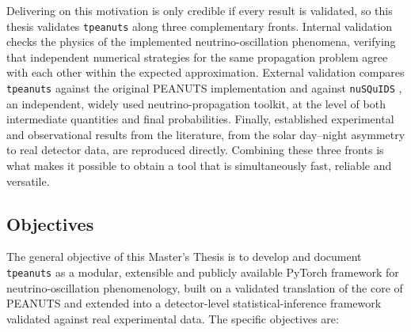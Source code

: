 Delivering on this motivation is only credible if every result is validated, so this thesis validates \texttt{tpeanuts} along three complementary fronts. Internal validation checks the physics of the implemented neutrino-oscillation phenomena, verifying that independent numerical strategies for the same propagation problem agree with each other within the expected approximation. External validation compares \texttt{tpeanuts} against the original PEANUTS implementation and against \texttt{nuSQuIDS} \parencite{nuSQuIDS}, an independent, widely used neutrino-propagation toolkit, at the level of both intermediate quantities and final probabilities. Finally, established experimental and observational results from the literature, from the solar day--night asymmetry to real detector data, are reproduced directly. Combining these three fronts is what makes it possible to obtain a tool that is simultaneously fast, reliable and versatile.

\subsection{Objectives}

The general objective of this Master's Thesis is to develop and document \texttt{tpeanuts} as a modular, extensible and publicly available PyTorch framework for neutrino-oscillation phenomenology, built on a validated translation of the core of PEANUTS and extended into a detector-level statistical-inference framework validated against real experimental data. The specific objectives are:

